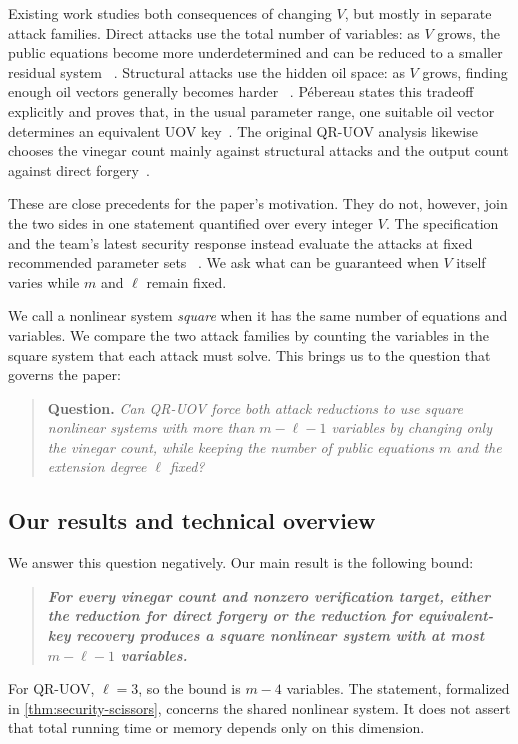\documentclass[11pt,a4paper]{article}
\theoremstyle{definition}
\theoremstyle{remark}
\newcommand{\QRUOV}{\textsf{QR-UOV}}
\begin{document}
Existing work studies both consequences of changing $V$, but mostly in
separate attack families.  Direct attacks use the total number of variables:
as $V$ grows, the public equations become more underdetermined and can be
reduced to a smaller residual system
~\cite{JustGuess,Hashimoto2023,ThomaeWolf2012,FurueUnderdetermined2021}.
Structural attacks use the hidden oil space: as $V$ grows, finding enough oil
vectors generally becomes harder
~\cite{KipnisShamir1998,DingEtAl2008,Beullens,Pebereau}.  P\'ebereau states this
tradeoff explicitly and proves that, in the usual parameter range, one suitable
oil vector determines an equivalent UOV key~\cite{Pebereau}.  The original
\QRUOV{} analysis likewise chooses the vinegar count mainly against structural
attacks and the output count against direct forgery~\cite{QRUOVOriginal}.

These are close precedents for the paper's motivation.  They do not, however,
join the two sides in one statement quantified over every integer $V$.  The
specification and the team's latest security response instead evaluate the
attacks at fixed recommended parameter sets
~\cite{QRUOVSpec,QRUOVResponse2026}.  We ask what can be guaranteed when $V$
itself varies while $m$ and $\ell$ remain fixed.

We call a nonlinear system \emph{square} when it has the same number of
equations and variables.  We compare the two attack families by counting the
variables in the square system that each attack must solve.  This brings us to
the question that governs the paper:
\begin{quote}
\noindent\textbf{Question.}
\emph{Can \QRUOV{} force both attack reductions to use square nonlinear
systems with more than $m-\ell-1$ variables by changing only the vinegar
count, while keeping the number of public equations $m$ and the extension
degree $\ell$ fixed?}
\end{quote}

\subsection{Our results and technical overview}\label{sec:intro-results}

We answer this question negatively.  Our main result is the following bound:
\begin{quote}
\centering
\textbf{\emph{For every vinegar count and nonzero verification target,
either the reduction for direct forgery or the reduction for equivalent-key
recovery produces a square nonlinear system with at most $m-\ell-1$
variables.}}
\end{quote}
For \QRUOV{}, $\ell=3$, so the bound is $m-4$ variables.  The statement,
formalized in \cref{thm:security-scissors}, concerns the shared nonlinear
system.  It does not assert that total running time or memory depends only on
this dimension.
\end{document}
